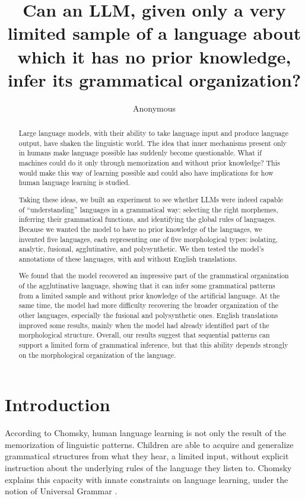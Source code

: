 \documentclass[11pt]{article}
\title{Can an LLM, given only a very limited sample of a language about which it has no prior knowledge, infer its grammatical organization?}
\author{Anonymous}
\date{}
\begin{document}
\maketitle

\begin{abstract}
Large language models, with their ability to take language input and produce language output, have shaken the linguistic world. The idea that inner mechanisms present only in humans make language possible has suddenly become questionable. What if machines could do it only through memorization and without prior knowledge? This would make this way of learning possible and could also have implications for how human language learning is studied.

Taking these ideas, we built an experiment to see whether LLMs were indeed capable of “understanding” languages in a grammatical way: selecting the right morphemes, inferring their grammatical functions, and identifying the global rules of languages. Because we wanted the model to have no prior knowledge of the languages, we invented five languages, each representing one of five morphological types: isolating, analytic, fusional, agglutinative, and polysynthetic. We then tested the model’s annotations of these languages, with and without English translations.

We found that the model recovered an impressive part of the grammatical organization of the agglutinative language, showing that it can infer some grammatical patterns from a limited sample and without prior knowledge of the artificial language. At the same time, the model had more difficulty recovering the broader organization of the other languages, especially the fusional and polysynthetic ones. English translations improved some results, mainly when the model had already identified part of the morphological structure. Overall, our results suggest that sequential patterns can support a limited form of grammatical inference, but that this ability depends strongly on the morphological organization of the language.
\end{abstract}

\section{Introduction}

According to Chomsky, human language learning is not only the result of the memorization of linguistic patterns. Children are able to acquire and generalize grammatical structures from what they hear, a limited input, without explicit instruction about the underlying rules of the language they listen to. Chomsky explains this capacity with innate constraints on language learning, under the notion of Universal Grammar \citep{chomsky1965}.
\end{document}

